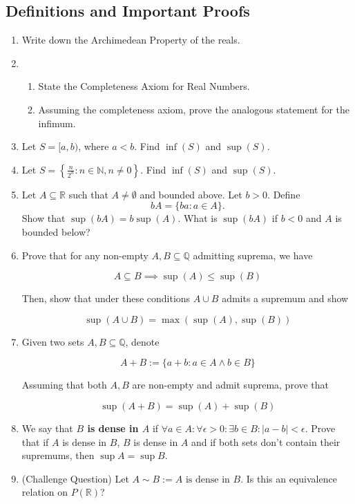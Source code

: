 \documentclass{article}
\theoremstyle{definition}
\newcommand{\R}{\mathbb{R}}
\begin{document}
\subsection{Definitions and Important Proofs}

\begin{enumerate}

    \item Write down the Archimedean Property of the reals.

    \item 
    
        \begin{enumerate}
        \item State the Completeness Axiom for Real Numbers.
        \item Assuming the completeness axiom, prove the analogous statement for the infimum.
        \end{enumerate}


    \item Let \( S = [a, b) \), where \( a < b \). Find \( \inf(S) \) and \( \sup(S) \).

    \item 
    Let \( S = \left\{ \frac{n}{2^{n}} : n \in \mathbb{N}, n \neq 0 \right\} \). Find \( \inf(S) \) and \( \sup(S) \).

    \item
    Let \( A \subseteq \mathbb{R} \) such that \( A \neq \emptyset \) and bounded above. Let \( b > 0 \). Define 
    \[ 
    bA = \{ba : a \in A\}.
    \]
    Show that \( \sup(bA) = b\sup(A) \). What is \( \sup(bA) \) if \( b < 0 \) and \( A \) is bounded below?

    \item Prove that for any non-empty $A,B \subseteq \mathbb{Q}$ admitting suprema, we have 

    \[ A \subseteq B \implies \sup(A) \leq \sup(B)\]

    Then, show that under these conditions $A \cup B$ admits a supremum and show

    \[ \sup(A \cup B) = \max(\sup(A), \sup(B))\]
    \item 

    Given two sets $A,B \subseteq \mathbb{Q}$, denote 

    \[ A + B := \{a + b : a \in A \land b \in B \}\]

    Assuming that both $A,B$ are non-empty and admit suprema, prove that 

    \[ \sup(A + B) = \sup(A) + \sup(B)\]

    \item We say that \textbf{$B$ is dense in $A$} if $\forall a \in A: \forall \epsilon > 0: \exists b \in B: \lvert a - b \rvert < \epsilon$.
    Prove that if $A$ is dense in $B$, $B$ is dense in $A$ and if both sets don't contain their supremums, then $\sup A = \sup B$.
    
    \item (Challenge Question) Let $A \sim B := \text{$A$ is dense in $B$}$. Is this an equivalence relation on $P(\R)$?
\end{enumerate}
\end{document}
